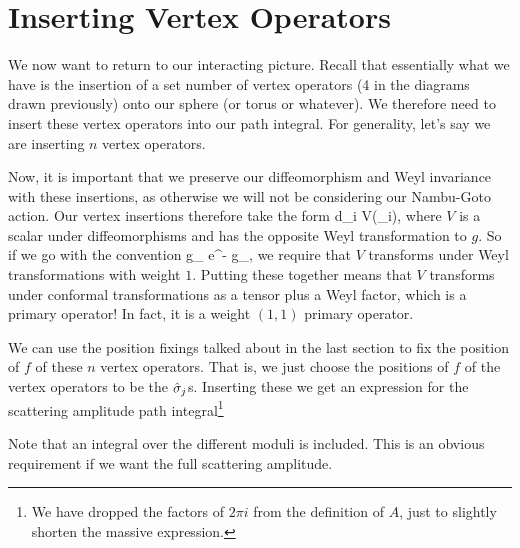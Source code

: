 \section{Inserting Vertex Operators}

We now want to return to our interacting picture. Recall that essentially what we have is the insertion of a set number of vertex operators (4 in the diagrams drawn previously) onto our sphere (or torus or whatever). We therefore need to insert these vertex operators into our path integral. For generality, let's say we are inserting $n$ vertex operators.

Now, it is important that we preserve our diffeomorphism and Weyl invariance with these insertions, as otherwise we will not be considering our Nambu-Goto action. Our vertex insertions therefore take the form 
\bse 
    \int d\sig_i  V(\sig_i),
\ese 
where $V$ is a scalar under diffeomorphisms and has the opposite Weyl transformation to $g$. So if we go with the convention 
\bse 
    g_{\a\beta} \to e^{-\phi} g_{\a\beta},
\ese 
we require that $V$ transforms under Weyl transformations with weight $1$. Putting these together means that $V$ transforms under conformal transformations as a tensor plus a Weyl factor, which is a primary operator! In fact, it is a weight $(1,1)$ primary operator.

We can use the position fixings talked about in the last section to fix the position of $f$ of these $n$ vertex operators. That is, we just choose the positions of $f$ of the vertex operators to be the $\hat{\sigma}_j$s. Inserting these we get an expression for the scattering amplitude path integral\footnote{We have dropped the factors of $2\pi i$ from the definition of $A$, just to slightly shorten the massive expression.}


\br 
    Note that an integral over the different moduli is included. This is an obvious requirement if we want the full scattering amplitude.
\er 

